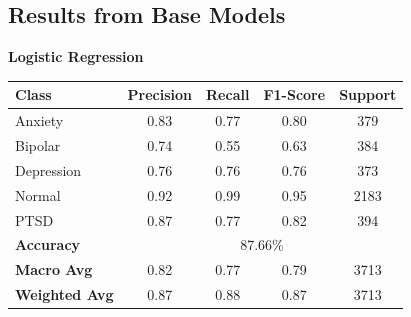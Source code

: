 \subsection{Results from Base Models}

\begin{center}
    \textbf{Logistic Regression} \\[0.5em]
    \begin{tabular}{|l|c|c|c|c|}
        \hline
        \textbf{Class} & \textbf{Precision} & \textbf{Recall} & \textbf{F1-Score} & \textbf{Support} \\ \hline
        Anxiety        & 0.83               & 0.77            & 0.80              & 379              \\ \hline
        Bipolar        & 0.74               & 0.55            & 0.63              & 384              \\ \hline
        Depression     & 0.76               & 0.76            & 0.76              & 373              \\ \hline
        Normal         & 0.92               & 0.99            & 0.95              & 2183             \\ \hline
        PTSD           & 0.87               & 0.77            & 0.82              & 394              \\ \hline
        \textbf{Accuracy} & \multicolumn{4}{|c|}{87.66\%} \\ \hline
        \textbf{Macro Avg} & 0.82            & 0.77            & 0.79              & 3713             \\ \hline
        \textbf{Weighted Avg} & 0.87         & 0.88            & 0.87              & 3713             \\ \hline
    \end{tabular}
\end{center}

\pagebreak

